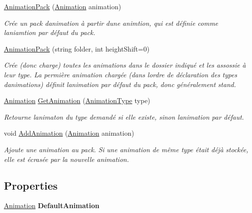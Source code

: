 \begin{DoxyCompactItemize}
\item 
\hyperlink{class_tentacle_slicers_1_1graphics_1_1_animation_pack_a5285e1eedcba48b991309be20569906f}{Animation\+Pack} (\hyperlink{class_tentacle_slicers_1_1graphics_1_1_animation}{Animation} animation)
\begin{DoxyCompactList}\small\item\em Crée un pack d\textquotesingle{}animation à partir d\textquotesingle{}une animtion, qui est définie comme l\textquotesingle{}aniamtion par défaut du pack. \end{DoxyCompactList}\item 
\hyperlink{class_tentacle_slicers_1_1graphics_1_1_animation_pack_a3af88f0914cd8bda260d0faf12f2a1a6}{Animation\+Pack} (string folder, int height\+Shift=0)
\begin{DoxyCompactList}\small\item\em Crée (donc charge) toutes les animations dans le dossier indiqué et les assossie à leur type. La permière animation chargée (dans l\textquotesingle{}ordre de déclaration des types d\textquotesingle{}animations) définit l\textquotesingle{}animation par défaut du pack, donc généralement stand. \end{DoxyCompactList}\item 
\hyperlink{class_tentacle_slicers_1_1graphics_1_1_animation}{Animation} \hyperlink{class_tentacle_slicers_1_1graphics_1_1_animation_pack_aa5912590d9054955b33919ecc99c2f49}{Get\+Animation} (\hyperlink{namespace_tentacle_slicers_1_1graphics_a9c92bd633d714099730f10897a01950b}{Animation\+Type} type)
\begin{DoxyCompactList}\small\item\em Retourne l\textquotesingle{}animaton du type demandé si elle existe, sinon l\textquotesingle{}animation par défaut. \end{DoxyCompactList}\item 
void \hyperlink{class_tentacle_slicers_1_1graphics_1_1_animation_pack_a0c54409bced801c3e5692a8b43837e89}{Add\+Animation} (\hyperlink{class_tentacle_slicers_1_1graphics_1_1_animation}{Animation} animation)
\begin{DoxyCompactList}\small\item\em Ajoute une animation au pack. Si une animation de même type était déjà stockée, elle est écrasée par la nouvelle animation. \end{DoxyCompactList}\end{DoxyCompactItemize}
\subsection*{Properties}
\begin{DoxyCompactItemize}
\item 
\mbox{\label{class_tentacle_slicers_1_1graphics_1_1_animation_pack_a834c686c787455ee76ae72c07d7e6065}} 
\hyperlink{class_tentacle_slicers_1_1graphics_1_1_animation}{Animation} {\bfseries Default\+Animation}
\end{DoxyCompactItemize}


